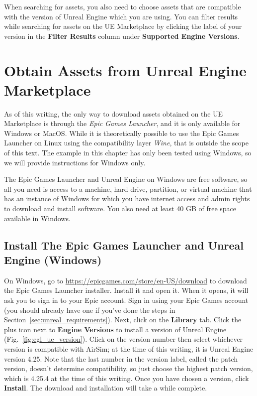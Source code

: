 When searching for assets, you also need to choose assets that are compatible with the version of Unreal Engine which you are using. You can filter results while searching for assets on the UE Marketplace by clicking the label of your version in the \textbf{Filter Results} column under \textbf{Supported Engine Versions}.

\section{Obtain Assets from Unreal Engine Marketplace}\label{sec:obtain_assets_windows}
As of this writing, the only way to download assets obtained on the UE Marketplace is through the \textit{Epic Games Launcher}, and it is only available for Windows or MacOS. While it is theoretically possible to use the Epic Games Launcher on Linux using the compatibility layer \textit{Wine}, that is outside the scope of this text. The example in this chapter has only been tested using Windows, so we will provide instructions for Windows only.

The Epic Games Launcher and Unreal Engine on Windows are free software, so all you need is access to a machine, hard drive, partition, or virtual machine that has an instance of Windows for which you have internet access and admin rights to download and install software. You also need at least 40 GB of free space available in Windows.

\subsection{Install The Epic Games Launcher and Unreal Engine (Windows)}

On Windows, go to \url{https://epicgames.com/store/en-US/download} to download the Epic Games Launcher installer. Install it and open it. When it opens, it will ask you to sign in to your Epic account. Sign in using your Epic Games account (you should already have one if you've done the steps in Section~\ref{sec:unreal_requirements}). Next, click on the \textbf{Library} tab. Click the plus icon next to \textbf{Engine Versions} to install a version of Unreal Engine (Fig.~\ref{fig:egl_ue_version}). Click on the version number then select whichever version is compatible with AirSim; at the time of this writing, it is Unreal Engine version 4.25. Note that the last number in the version label, called the patch version, doesn't determine compatibility, so just choose the highest patch version, which is 4.25.4 at the time of this writing. Once you have chosen a version, click \textbf{Install}. The download and installation will take a while complete.

